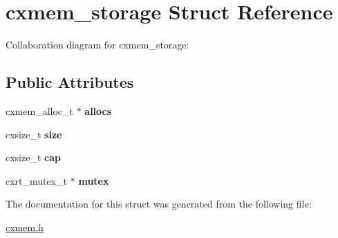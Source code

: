 \hypertarget{a00056}{}\section{cxmem\+\_\+storage Struct Reference}
\label{a00056}


Collaboration diagram for cxmem\+\_\+storage\+:
\subsection*{Public Attributes}
\begin{DoxyCompactItemize}
\item 
\mbox{\label{a00056_a4663e63ea74aef2a831c26f29cec7147}} 
cxmem\+\_\+alloc\+\_\+t $\ast$ {\bfseries allocs}
\item 
\mbox{\label{a00056_ae0e190eb4581da409bcf0c1709852e9f}} 
cxsize\+\_\+t {\bfseries size}
\item 
\mbox{\label{a00056_a631394e8755be3e93cd90beeeb51ff3c}} 
cxsize\+\_\+t {\bfseries cap}
\item 
\mbox{\label{a00056_a9c77308d0cf6fc2016ebaaafc77e0402}} 
cxrt\+\_\+mutex\+\_\+t $\ast$ {\bfseries mutex}
\end{DoxyCompactItemize}


The documentation for this struct was generated from the following file\+:\begin{DoxyCompactItemize}
\item 
\hyperlink{a00017}{cxmem.\+h}\end{DoxyCompactItemize}
